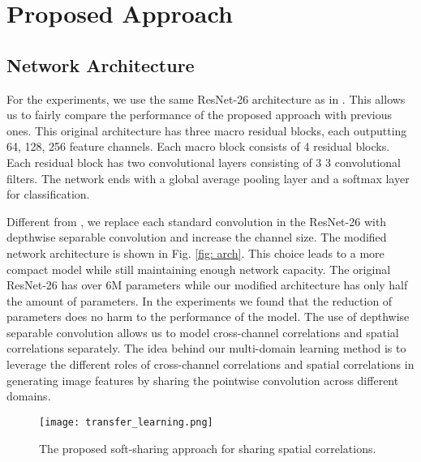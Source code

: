 \documentclass[letterpaper]{article} \usepackage{aaai19}  \usepackage{times}  \usepackage{helvet}  \usepackage{courier}  \usepackage{url}  \usepackage{graphicx}  \usepackage{amssymb}
\begin{document}
 
\section{Proposed Approach}
\iffalse
This section presents our proposed approach for multi-domain learning. We start with the network architecture. Then we introduce how to extend a single domain neural network to multiple domains. Finally, we propose a soft sharing method to encourage the maximal information sharing across different domains.
\fi
\subsection{Network Architecture}
For the experiments, we use the same ResNet-26 architecture as in \cite{rebuffi18efficient}. This allows us to fairly compare the performance of the proposed approach with previous ones. This original architecture has three macro residual blocks, each outputting 64, 128, 256 feature channels. Each macro block consists of 4 residual blocks. Each residual block has two convolutional layers consisting of 3  3 convolutional filters. The network ends with a global average pooling layer and a softmax layer for classification. 

Different from \cite{rebuffi18efficient}, we replace each standard convolution in the ResNet-26 with depthwise separable convolution and increase the channel size. The modified network architecture is shown in Fig. \ref{fig: arch}. This choice leads to a more compact model while still maintaining enough network capacity. The original ResNet-26 has over 6M parameters while our modified architecture has only half the amount of parameters. In the experiments we found that the reduction of parameters does no harm to the performance of the model. The use of depthwise separable convolution allows us to model cross-channel correlations and spatial correlations separately. The idea behind our multi-domain learning method is to leverage the different roles of cross-channel correlations and spatial correlations in generating image features by sharing the pointwise convolution across different domains. 

\begin{figure*}[t]
\centering
\texttt{[image: transfer\_learning.png]}
\caption{The proposed soft-sharing approach for sharing spatial correlations.}
\label{fig: transfer}
\end{figure*}
\end{document}
